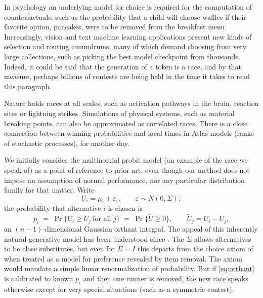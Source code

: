 \documentclass[11pt]{article}
\begin{document}
In psychology an underlying model for choice is required for the computation of counterfactuals: such as the probability that a child will choose waffles if their favorite option, pancakes, were to be removed from the breakfast menu. Increasingly, vision and text machine learning applications present new kinds of selection and routing conundrums, many of which demand choosing from very large collections, such as picking the best model checkpoint from thousands. Indeed, it could be said that the generation of a token is a race, and by that measure, perhaps billions of contests are being held in the time it takes to read this paragraph.

Nature holds races at all scales, such as activation pathways in the brain, reaction sites or lightning strikes. Simulations of physical systems, such as material breaking points, can also be approximated as correlated races. There is a close connection between winning probabilities and local times in Atlas models (ranks of stochastic processes), for another day.

We initially consider the multinomial probit model (an example of the race we speak of) as a point of reference to prior art, even though our method does not impose an assumption of normal performance, nor any particular distribution family for that matter. Write
\begin{equation}
U_i = \mu_i + \varepsilon_i, \qquad \varepsilon\sim N(0,\Sigma);
\end{equation}
the probability that alternative $i$ is chosen is
\begin{equation}\label{eq:orthant}
p_i \;=\; \Pr\{U_i \ge U_j \ \text{for all } j\}
      \;=\; \Pr\{\tilde U \ge 0\},
\qquad \tilde U_j = U_i - U_j,
\end{equation}
an $(n-1)$-dimensional Gaussian orthant integral. The appeal of this inherently natural generative model has been understood since \citet{thurstone1927}. The $\Sigma$ allows alternatives to be close substitutes, but even for $\Sigma=I$ this departs from the choice axiom of \citet{luce1959} when treated as a model for preference revealed by item removal. The axiom would mandate a simple linear renormalization of probability. But if \eqref{eq:orthant} is calibrated to known $p_i$ and then one runner is removed, the new race speaks otherwise except for very special situations (such as a symmetric contest).
\end{document}
